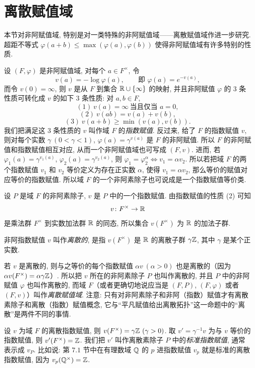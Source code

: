 \section{离散赋值域}\label{sec:ch7-s3}

本节对非阿赋值域, 特别是对一类特殊的非阿赋值域——离散赋值域作进一步研究. 超距不等式 $\varphi(a+b)\leqslant\max(\varphi(a),\varphi(b))$ 使得非阿赋值域有许多特别的性质.

设 $(F,\varphi)$ 是非阿赋值域, 对每个 $a\in F^{\times}$, 令
\[
  v(a)=-\log\varphi(a),\qquad\text{即 } \varphi(a)=e^{-v(a)},
\]
而令 $v(0)=\infty$, 则 $v$ 是从 $F$ 到集合 $\mathbb{R}\cup\{\infty\}$ 的映射, 并且非阿赋值 $\varphi$ 的 $3$ 条性质可转化成 $v$ 的如下 $3$ 条性质: 对 $a,b\in F$,
\[
  (1)\ v(a)=\infty\ \text{当且仅当 } a=0,
\]
\[
  (2)\ v(ab)=v(a)+v(b),
\]
\[
  (3)\ v(a+b)\geqslant\min(v(a),v(b)).
\]
我们把满足这 $3$ 条性质的 $v$ 叫作域 $F$ 的\emph{指数赋值}. 反过来, 给了 $F$ 的指数赋值 $v$, 则对每个实数 $\gamma\ (0<\gamma<1)$, $\varphi(a)=\gamma^{v(a)}$ 是 $F$ 的非阿赋值. 所以 $F$ 的非阿赋值和指数赋值相互对应, 从而一个非阿赋值域也可写成 $(F,v)$. 进而, 若 $\varphi_1(a)=\gamma^{v_1(a)}$, $\varphi_2(a)=\gamma^{v_2(a)}$, 则 $\varphi_1=\varphi_2^{\alpha}\Leftrightarrow v_1=\alpha v_2$. 所以若把域 $F$ 的两个指数赋值 $v_1$ 和 $v_2$ 等价定义为存在正实数 $\alpha$, 使得 $v_1=\alpha v_2$, 那么等价的赋值对应等价的指数赋值. 所以域 $F$ 的一个非阿素除子也可说成是一个指数赋值等价类.

设 $P$ 是域 $F$ 的非阿素除子, $v$ 是 $P$ 中的一个指数赋值. 由指数赋值的性质 (2) 可知
\[
  v\colon F^{\times}\to\mathbb{R}
\]
是乘法群 $F^{\times}$ 到实数加法群 $\mathbb{R}$ 的同态, 所以集合 $v(F^{\times})$ 为 $\mathbb{R}$ 的加法子群.

\begin{definition}\label{def:ch7-5}
非阿指数赋值 $v$ 叫作\emph{离散的}, 是指 $v(F^{\times})$ 是 $\mathbb{R}$ 的离散子群 $\gamma\mathbb{Z}$, 其中 $\gamma$ 是某个正实数.
\end{definition}

若 $v$ 是离散的, 则与之等价的每个指数赋值 $\alpha v\ (\alpha>0)$ 也是离散的（因为 $\alpha v(F^{\times})=\alpha\gamma\mathbb{Z}$）. 所以把 $v$ 所在的非阿素除子 $P$ 也叫作离散的, 并且 $P$ 中的非阿赋值 $\varphi$ 也叫作离散的, 而域 $F$（或者更确切地说应当是 $(F,P)$, $(F,\varphi)$ 或者 $(F,v)$）叫作\emph{离散赋值域}. 注意: 只有对非阿素除子和非阿（指数）赋值才有离散素除子和离散（指数）赋值概念, 它与``平凡赋值给出离散拓扑''这一命题中的``离散''是两件不同的事情.

设 $v$ 为域 $F$ 的离散指数赋值, 则 $v(F^{\times})=\gamma\Z\ (\gamma>0)$. 取 $v'=\gamma^{-1}v$ 为与 $v$ 等价的指数赋值, 则 $v'(F^{\times})=\mathbb{Z}$. 我们把 $v'$ 叫作离散素除子 $P$ 中的\emph{标准指数赋值}, 通常表示成 $v_P$. 比如说: 第 $7.1$ 节中在有理数域 $\mathbb{Q}$ 的 $p$ 进指数赋值 $v_p$ 就是标准的离散指数赋值, 因为 $v_p(\mathbb{Q}^{\times})=\mathbb{Z}$.

